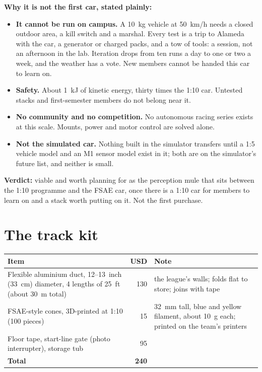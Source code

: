 \documentclass[11pt,a4paper]{article}
\begin{document}
\textbf{Why it is not the first car, stated plainly:}
\begin{itemize}
  \item \textbf{It cannot be run on campus.} A 10~kg vehicle at 50~km/h needs a closed
  outdoor area, a kill switch and a marshal. Every test is a trip to Alameda with the car, a
  generator or charged packs, and a tow of tools: a session, not an afternoon in the lab. Iteration
  drops from ten runs a day to one or two a week, and the weather has a vote. New members
  cannot be handed this car to learn on.
  \item \textbf{Safety.} About 1~kJ of kinetic energy, thirty times the 1:10 car. Untested
  stacks and first-semester members do not belong near it.
  \item \textbf{No community and no competition.} No autonomous racing series exists at this
  scale. Mounts, power and motor control are solved alone.
  \item \textbf{Not the simulated car.} Nothing built in the simulator transfers until a 1:5
  vehicle model and an M1 sensor model exist in it; both are on the simulator's future list,
  and neither is small.
\end{itemize}
\textbf{Verdict:} viable and worth planning for as the perception mule that sits between the
1:10 programme and the FSAE car, once there is a 1:10 car for members to learn on and a stack
worth putting on it. Not the first purchase.

\section{The track kit}
\label{sec:track}

\begin{tabularx}{\linewidth}{p{6.2cm}rX}
\toprule
Item & USD & Note \\
\midrule
Flexible aluminium duct, 12--13~inch (33~cm) diameter, 4 lengths of 25~ft (about 30~m total) & 130 & the league's walls; folds flat to store; joins with tape \\
FSAE-style cones, 3D-printed at 1:10 (100 pieces) & 15 & 32~mm tall, blue and yellow filament, about 10~g each; printed on the team's printers \\
Floor tape, start-line gate (photo interrupter), storage tub & 95 & \\
\midrule
\textbf{Total} & \textbf{240} & \\
\bottomrule
\end{tabularx}
\end{document}
